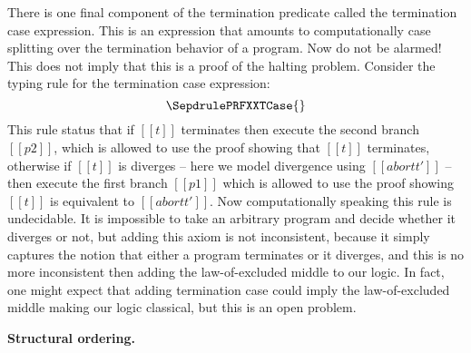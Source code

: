 There is one final component of the termination predicate called the
termination case expression.  This is an expression that amounts to
computationally case splitting over the termination behavior of a
program.  Now do not be alarmed!  This does not imply that this is a
proof of the halting problem.  Consider the typing rule for the
termination case expression: \[ \SepdrulePRFXXTCase{} \] This rule
status that if $[[t]]$ terminates then execute the second branch
$[[p2]]$, which is allowed to use the proof showing that $[[t]]$
terminates, otherwise if $[[t]]$ is diverges -- here we model
divergence using $[[abort t']]$ -- then execute the first branch
$[[p1]]$ which is allowed to use the proof showing $[[t]]$ is
equivalent to $[[abort t']]$.  Now computationally speaking this rule
is undecidable.  It is impossible to take an arbitrary program and
decide whether it diverges or not, but adding this axiom is not
inconsistent, because it simply captures the notion that either a
program terminates or it diverges, and this is no more inconsistent
then adding the law-of-excluded middle to our logic.  In fact, one
might expect that adding termination case could imply the
law-of-excluded middle making our logic classical, but this is an open
problem.

\textbf{Structural ordering.}
